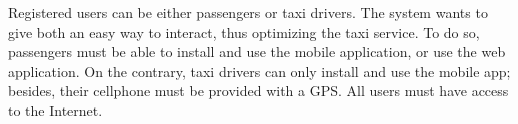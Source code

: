 Registered users can be either passengers or taxi drivers.\newline
The system wants to give both an easy way to interact, thus optimizing the taxi service. To do so, passengers must be able to install and use the mobile application, or use the web application. On the contrary, taxi drivers can only install and use the mobile app; besides, their cellphone must be provided with a GPS. All users must have access to the Internet.
